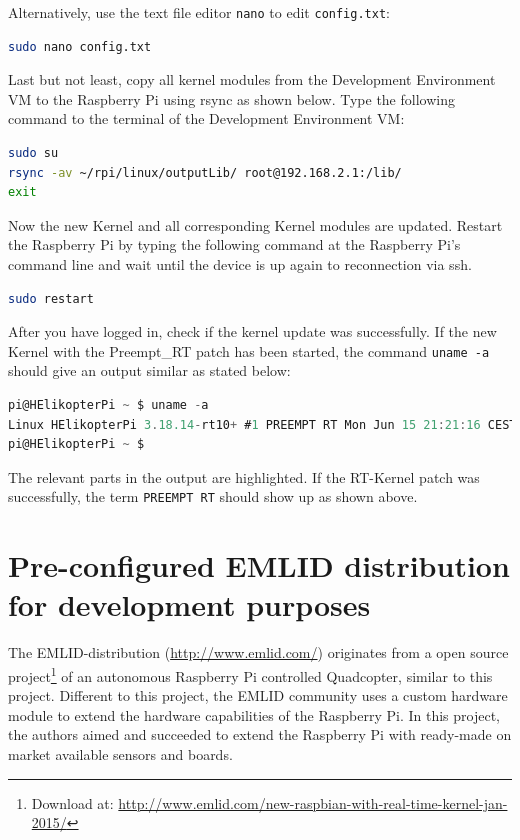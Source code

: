 Alternatively, use the text file editor \texttt{nano} to edit \texttt{config.txt}:
\begin{lstlisting}[language=bash,otherkeywords={make,scp,dd,sudo}]
sudo nano config.txt
\end{lstlisting}

Last but not least, copy all kernel modules from the Development Environment VM to the Raspberry Pi using rsync as shown below. Type the following command to the terminal of the Development Environment VM:
\begin{lstlisting}[language=bash,otherkeywords={make,scp,dd,sudo}]
sudo su
rsync -av ~/rpi/linux/outputLib/ root@192.168.2.1:/lib/
exit
\end{lstlisting}

Now the new Kernel and all corresponding Kernel modules are updated. Restart the Raspberry Pi by typing the following command at the Raspberry Pi's command line and wait until the device is up again to reconnection via ssh.
\begin{lstlisting}[language=bash,otherkeywords={make,scp,dd,sudo}]
sudo restart
\end{lstlisting}

After you have logged in, check if the kernel update was successfully. If the new Kernel with the Preempt\_RT patch has been started, the command \texttt{uname -a} should give an output similar as stated below:
\begin{lstlisting}[language=C,otherkeywords={uname,PREEMPT,RT}]
pi@HElikopterPi ~ $ uname -a
Linux HElikopterPi 3.18.14-rt10+ #1 PREEMPT RT Mon Jun 15 21:21:16 CEST 2015 armv6l GNU/Linux
pi@HElikopterPi ~ $
\end{lstlisting}

The relevant parts in the output are highlighted. If the RT-Kernel patch was successfully, the term \texttt{PREEMPT RT} should show up as shown above.

\section[EMLID distribution for development purposes]{Pre-configured EMLID distribution for development purposes}
\label{sec:OS:emlid}

The EMLID-distribution (\url{http://www.emlid.com/}) originates from a open source project\footnote{Download at: \url{http://www.emlid.com/new-raspbian-with-real-time-kernel-jan-2015/}} of an autonomous Raspberry Pi controlled Quadcopter, similar to this project. Different to this project, the EMLID community uses a custom hardware module to extend the hardware capabilities of the Raspberry Pi. In this project, the authors aimed and succeeded to extend the Raspberry Pi with ready-made on market available sensors and boards.

